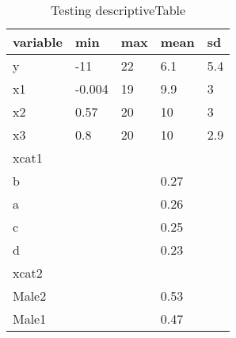 \begin{table}[H]
\centering
\caption{Testing descriptiveTable} 
\label{tab:makedesc100}
\begin{tabular}{lllll}
  \hline
variable & min & max & mean & sd \\ 
  \hline
y & -11 &  22 & 6.1 & 5.4 \\ 
  x1 & -0.004 &  19 & 9.9 &   3 \\ 
  x2 & 0.57 &  20 &  10 &   3 \\ 
  x3 & 0.8 &  20 &  10 & 2.9 \\ 
  xcat1 &  &  &  &  \\ 
  b &  &  & 0.27 &  \\ 
  a &  &  & 0.26 &  \\ 
  c &  &  & 0.25 &  \\ 
  d &  &  & 0.23 &  \\ 
  xcat2 &  &  &  &  \\ 
  Male2 &  &  & 0.53 &  \\ 
  Male1 &  &  & 0.47 &  \\ 
   \hline
\end{tabular}
\end{table}
